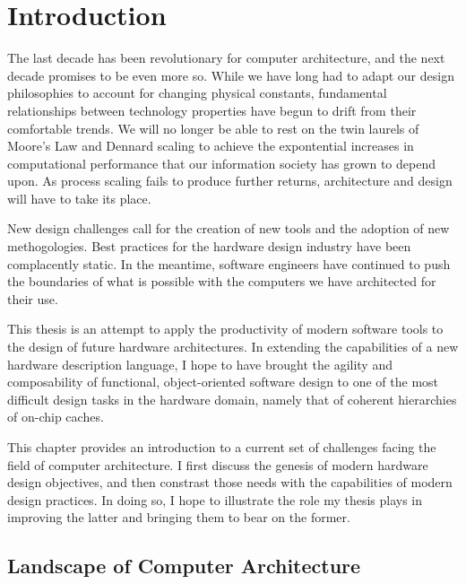 \chapter{Introduction}
\label{c.intro}

The last decade has been revolutionary for computer architecture, and the next decade promises to be even more so.
While we have long had to adapt our design philosophies to account for changing physical constants,
fundamental relationships between technology properties have begun to drift from their comfortable trends.
We will no longer be able to rest on the twin laurels of Moore's Law and Dennard scaling to achieve the
expontential increases in computational performance that our information society has grown to depend upon.
As process scaling fails to produce further returns, architecture and design will have to take its place.

New design challenges call for the creation of new tools and the adoption of new methogologies.
Best practices for the hardware design industry have been complacently static.
In the meantime, software engineers have continued to push the boundaries of what is possible with the computers we have architected for their use.

This thesis is an attempt to apply the productivity of modern software tools to the design of future hardware architectures.
In extending the capabilities of a new hardware description language, I hope to have brought the agility and composability of functional, object-oriented software design to one of the most difficult design tasks in the hardware domain,
namely that of coherent hierarchies of on-chip caches.

This chapter provides an introduction to a current set of challenges facing the field of computer architecture.
I first discuss the genesis of modern hardware design objectives,
and then constrast those needs with the capabilities of modern design practices.
In doing so, I hope to illustrate the role my thesis plays in improving the latter and bringing them to bear on the former. 

\section{Landscape of Computer Architecture}

